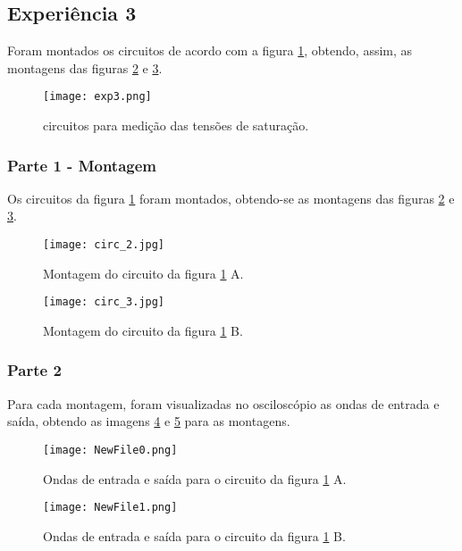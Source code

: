\documentclass{abntex2}
\begin{document}
\clearpage

\subsection{Experiência 3}

Foram montados os circuitos de acordo com a figura \ref{fig:circuito3}, obtendo, assim, as montagens das figuras \ref{fig:montagem3} e \ref{fig:montagem4}.

\begin{figure}[h]
  \centering
  \texttt{[image: exp3.png]}
  \caption{circuitos para medição das tensões de saturação.}
  \label{fig:circuito3}
\end{figure}

\subsubsection{Parte 1 - Montagem}

Os circuitos da figura \ref{fig:circuito3} foram montados, obtendo-se as montagens das figuras \ref{fig:montagem3} e \ref{fig:montagem4}.

\begin{figure}[h]
  \centering
  \texttt{[image: circ\_2.jpg]}
  \caption{Montagem do circuito da figura \ref{fig:circuito3} A.}
  \label{fig:montagem3}
\end{figure}
\begin{figure}[h]
  \centering
  \texttt{[image: circ\_3.jpg]}
  \caption{Montagem do circuito da figura \ref{fig:circuito3} B.}
  \label{fig:montagem4}
\end{figure}

\subsubsection{Parte 2}
Para cada montagem, foram visualizadas no osciloscópio as ondas de entrada e saída, obtendo as imagens \ref{fig:inout1} e \ref{fig:inout2} para as montagens.
\begin{figure}[h]
  \centering
  \texttt{[image: NewFile0.png]}
  \caption{Ondas de entrada e saída para o circuito da figura \ref{fig:circuito3} A.}
  \label{fig:inout1}
\end{figure}
\begin{figure}[h]
  \centering
  \texttt{[image: NewFile1.png]}
  \caption{Ondas de entrada e saída para o circuito da figura \ref{fig:circuito3} B.}
  \label{fig:inout2}
\end{figure}
\pagebreak
\end{document}
